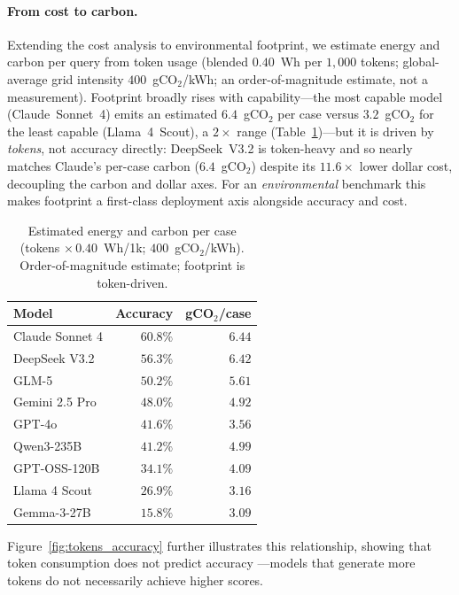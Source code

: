 \documentclass[sigconf]{acmart}
\begin{document}
\paragraph{From cost to carbon.} Extending the cost analysis to environmental footprint, we estimate energy and carbon per query from token usage (blended $0.40$~Wh per $1{,}000$ tokens; global-average grid intensity $400$~gCO$_2$/kWh; an order-of-magnitude estimate, not a measurement). Footprint broadly rises with capability---the most capable model (Claude~Sonnet~4) emits an estimated $6.4$~gCO$_2$ per case versus $3.2$~gCO$_2$ for the least capable (Llama~4~Scout), a $2\times$ range (Table~\ref{tab:sustainability})---but it is driven by \emph{tokens}, not accuracy directly: DeepSeek~V3.2 is token-heavy and so nearly matches Claude's per-case carbon ($6.4$~gCO$_2$) despite its $11.6\times$ lower dollar cost, decoupling the carbon and dollar axes. For an \emph{environmental} benchmark this makes footprint a first-class deployment axis alongside accuracy and cost.

\begin{table}[ht]
  \caption{Estimated energy and carbon per case (tokens $\times\,0.40$~Wh/1k; $400$~gCO$_2$/kWh). Order-of-magnitude estimate; footprint is token-driven.}
  \label{tab:sustainability}
  \centering
  \begin{tabular}{lrr}
    \toprule
    \textbf{Model} & \textbf{Accuracy} & \textbf{gCO$_2$/case} \\
    \midrule
    Claude Sonnet 4 & $60.8\%$ & $6.44$ \\
    DeepSeek V3.2   & $56.3\%$ & $6.42$ \\
    GLM-5           & $50.2\%$ & $5.61$ \\
    Gemini 2.5 Pro  & $48.0\%$ & $4.92$ \\
    GPT-4o          & $41.6\%$ & $3.56$ \\
    Qwen3-235B      & $41.2\%$ & $4.99$ \\
    GPT-OSS-120B    & $34.1\%$ & $4.09$ \\
    Llama 4 Scout   & $26.9\%$ & $3.16$ \\
    Gemma-3-27B     & $15.8\%$ & $3.09$ \\
    \bottomrule
  \end{tabular}
\end{table}

Figure~\ref{fig:tokens_accuracy} further illustrates this relationship, showing that token consumption does not predict accuracy ---models that generate more tokens do not necessarily achieve higher scores.
\end{document}
